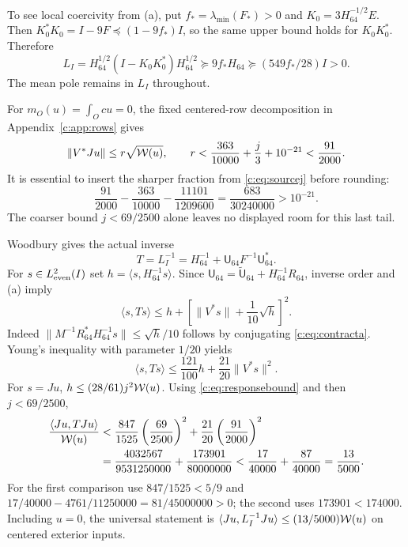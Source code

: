 \documentclass[11pt,a4paper]{article}
\numberwithin{equation}{section}
\theoremstyle{definition}\newtheorem{definition}[theorem]{Definition}
\theoremstyle{remark}\newtheorem{remark}[theorem]{Remark}
\newcommand{\ip}[2]{\langle#1,#2\rangle}\newcommand{\norm}[1]{\lVert#1\rVert}\newcommand{\abs}[1]{\lvert#1\rvert}
\begin{document}
To see local coercivity from (a), put $f_*=\lambda_{\min}(F_*)>0$ and
$K_0=3H_{64}^{-1/2}E$. Then
$K_0^*K_0=I-9F\preceq(1-9f_*)I$, so the same upper bound holds for
$K_0K_0^*$. Therefore
\begin{equation}\label{c:eq:Lcoercive}
 L_I=H_{64}^{1/2}(I-K_0K_0^*)H_{64}^{1/2}
 \succeq9f_*H_{64}\succeq(549f_*/28)I>0.
\end{equation}
The mean pole remains in $L_I$ throughout.

For $m_O(u)=\int_Ocu=0$, the fixed centered-row decomposition in Appendix~\ref{c:app:rows} gives
\begin{equation}\label{c:eq:responsebound}
 \norm{V^*Ju}\le r\sqrt{\wo(u)},\qquad
 r<\frac{363}{10000}+\frac j3+10^{-21}<\frac{91}{2000}.
\end{equation}
It is essential to insert the sharper fraction from \eqref{c:eq:sourcej} before rounding:
\[
 \frac{91}{2000}-\frac{363}{10000}-\frac{11101}{1209600}
 =\frac{683}{30240000}>10^{-21}.
\]
The coarser bound $j<69/2500$ alone leaves no displayed room for this last tail.

Woodbury gives the actual inverse
\[
 T=L_I^{-1}=H_{64}^{-1}+\mathsf U_{64}F^{-1}\mathsf U_{64}^*.
\]
For $s\in L^2_{\rm even}(I)$ set $h=\ip s{H_{64}^{-1}s}$.
Since $\mathsf U_{64}=\widetilde{\mathsf U}_{64}+H_{64}^{-1}R_{64}$, inverse order and (a) imply
\[
 \ip s{Ts}\le h+
 \left[\norm{V^*s}+\frac1{10}\sqrt h\right]^2.
\]
Indeed
$\norm{M^{-1}R_{64}^*H_{64}^{-1}s}\le\sqrt h/10$
follows by conjugating \eqref{c:eq:contracta}.
Young's inequality with parameter $1/20$ yields
\[
 \ip s{Ts}\le\frac{121}{100}h+\frac{21}{20}\norm{V^*s}^2.
\]
For $s=Ju$, $h\le(28/61)j^2\mathcal W(u)$.
Using \eqref{c:eq:responsebound} and then $j<69/2500$,
\begin{align}
 \frac{\ip{Ju}{TJu}}{\wo(u)}
 &<\frac{847}{1525}\left(\frac{69}{2500}\right)^2
 +\frac{21}{20}\left(\frac{91}{2000}\right)^2\notag\\
 &=\frac{4032567}{9531250000}+\frac{173901}{80000000}
 <\frac{17}{40000}+\frac{87}{40000}=\frac{13}{5000}.\label{c:eq:inversecost}
\end{align}
For the first comparison use $847/1525<5/9$ and
$17/40000-4761/11250000=81/45000000>0$; the second uses $173901<174000$.
Including $u=0$, the universal statement is
$\ip{Ju}{L_I^{-1}Ju}\le(13/5000)\wo(u)$ on centered exterior inputs.
\end{document}
